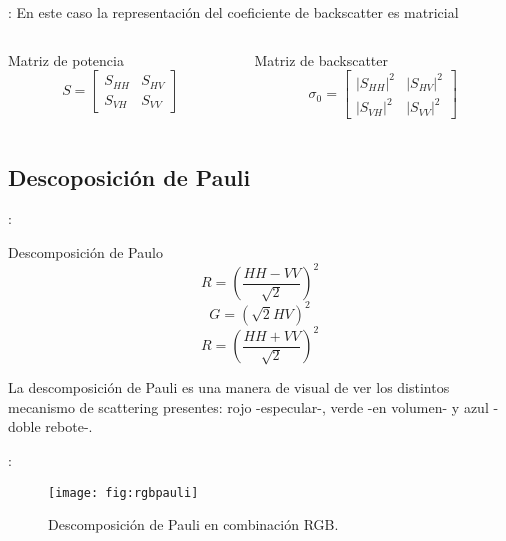 \begin{frame}{\secname : \subsecname}
  En este caso la representación del coeficiente de backscatter es matricial
  \begin{columns}
    \begin{column}{0.5\textwidth}
     \begin{block}{Matriz de potencia}
      \begin{equation}
        S=
  \begin{bmatrix}
    S_{HH} & S_{HV} \\
    S_{VH} & S_{VV}
  \end{bmatrix}
      \end{equation}
     \end{block}
    \end{column}
    \begin{column}{0.5\textwidth}  %
      \begin{block}{Matriz de backscatter}
        \begin{equation}
          \sigma_0=
  \begin{bmatrix}
    |S_{HH}|^2 & |S_{HV}|^2 \\
    |S_{VH}|^2 & |S_{VV}|^2
  \end{bmatrix}
        \end{equation}
      \end{block}
    \end{column}
    \end{columns}
\end{frame}

\subsection{Descoposición de Pauli}

\begin{frame}{\secname : \subsecname}
     \begin{block}{Descomposición de Paulo}
      \begin{equation}
        R = \left(\frac{HH-VV}{\sqrt{2}}\right)^2
      \end{equation}
      \begin{equation}
        G = \left(\sqrt{2}HV\right)^2
      \end{equation}
      \begin{equation}
        R = \left(\frac{HH+VV}{\sqrt{2}}\right)^2
      \end{equation}
     \end{block}
    La descomposición de Pauli es una manera de visual de ver los distintos mecanismo de scattering presentes: rojo -especular-, verde -en volumen- y azul -doble rebote-.
\end{frame}

\begin{frame}{\secname : \subsecname}
  \begin{figure}
    \centering
    \texttt{[image: fig:rgbpauli]}
    \caption{Descomposición de Pauli en combinación RGB.}
    \label{}
  \end{figure}
\end{frame}
